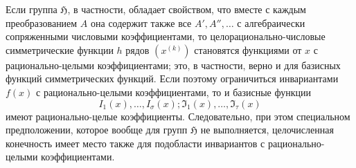\documentclass[11pt]{article}
\providecommand{\frH}{\mathfrak H}
\begin{document}
Если группа \(\frH\), в частности, обладает свойством, что вместе с каждым преобразованием \(A\) она содержит также все \(A',A'',\ldots\) с алгебраически сопряженными числовыми коэффициентами, то целорационально-числовые симметрические функции \(h\) рядов \((x^{(k)})\) становятся функциями от \(x\) с рационально-целыми коэффициентами; это, в частности, верно и для базисных функций симметрических функций. Если поэтому ограничиться инвариантами \(f(x)\) с рационально-целыми коэффициентами, то и базисные функции
\[
        I_1(x),\ldots,I_\sigma(x);\mathfrak I_1(x),\ldots,\mathfrak I_\tau(x)
\]
имеют рационально-целые коэффициенты. Следовательно, при этом специальном предположении, которое вообще для групп \(\frH\) не выполняется, целочисленная конечность имеет место также для подобласти инвариантов с рационально-целыми коэффициентами.
\end{document}
